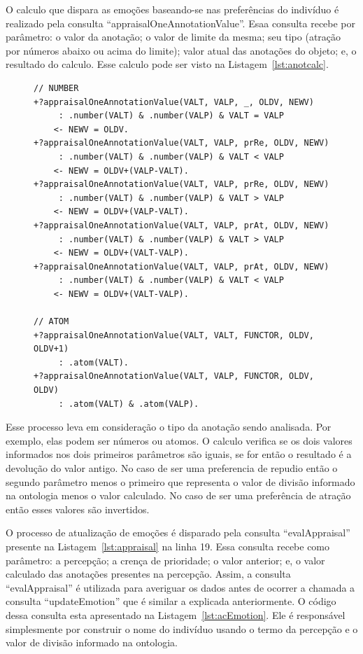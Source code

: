 O calculo que dispara as emoções baseando-se nas preferências do indivíduo é
realizado pela consulta ``appraisalOneAnnotationValue''. Esaa consulta recebe
por parâmetro: o valor da anotação; o valor de limite da mesma; seu tipo
(atração por números abaixo ou acima do limite); valor atual das anotações do
objeto; e, o resultado do calculo. Esse calculo pode ser visto na
Listagem~\ref{lst:anotcalc}.

\begin{figure}
\begin{center}
    \begin{minipage}{130mm}
	\lstset{linewidth=130mm}
	\begin{lstlisting}[frame=trbl,
caption=Amostra de código referente ao calculo de uma anotação.,
label=lst:anotcalc]
// NUMBER
+?appraisalOneAnnotationValue(VALT, VALP, _, OLDV, NEWV)
     : .number(VALT) & .number(VALP) & VALT = VALP
    <- NEWV = OLDV.
+?appraisalOneAnnotationValue(VALT, VALP, prRe, OLDV, NEWV)
     : .number(VALT) & .number(VALP) & VALT < VALP
    <- NEWV = OLDV+(VALP-VALT).
+?appraisalOneAnnotationValue(VALT, VALP, prRe, OLDV, NEWV)
     : .number(VALT) & .number(VALP) & VALT > VALP
    <- NEWV = OLDV+(VALP-VALT).
+?appraisalOneAnnotationValue(VALT, VALP, prAt, OLDV, NEWV)
     : .number(VALT) & .number(VALP) & VALT > VALP
    <- NEWV = OLDV+(VALT-VALP).
+?appraisalOneAnnotationValue(VALT, VALP, prAt, OLDV, NEWV)
     : .number(VALT) & .number(VALP) & VALT < VALP
    <- NEWV = OLDV+(VALT-VALP).

// ATOM
+?appraisalOneAnnotationValue(VALT, VALT, FUNCTOR, OLDV, OLDV+1)
     : .atom(VALT).
+?appraisalOneAnnotationValue(VALT, VALP, FUNCTOR, OLDV, OLDV)
     : .atom(VALT) & .atom(VALP).
	\end{lstlisting}
    \end{minipage}
\end{center}
\end{figure}

Esse processo leva em consideração o tipo da anotação sendo analisada. Por
exemplo, elas podem ser números ou atomos. O calculo verifica se os dois
valores informados nos dois primeiros parâmetros são iguais, se for então o
resultado é a devolução do valor antigo. No caso de ser uma preferencia de
repudio então o segundo parâmetro menos o primeiro que representa o valor
de divisão informado na ontologia menos o valor calculado. No caso de ser uma
preferência de atração então esses valores são invertidos.

O processo de atualização de emoções é disparado pela consulta
``evalAppraisal'' presente na Listagem~\ref{lst:appraisal} na linha 19.
Essa consulta recebe como parâmetro: a percepção; a crença de prioridade;
o valor anterior; e, o valor calculado das anotações presentes na percepção.
Assim, a consulta ``evalAppraisal'' é utilizada para averiguar os dados antes
de ocorrer a chamada a consulta ``updateEmotion'' que é similar a explicada
anteriormente. O código dessa consulta esta apresentado na
Listagem~\ref{lst:acEmotion}. Ele é responsável simplesmente por construir o
nome do indivíduo usando o termo da percepção e o valor de divisão informado
na ontologia.

